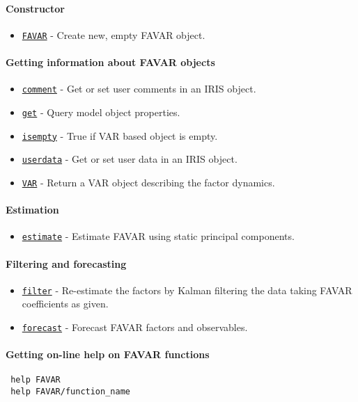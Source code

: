 

	\paragraph{Constructor}
 
 \begin{itemize}
 \item
   \href{FAVAR/FAVAR}{\texttt{FAVAR}} - Create new, empty FAVAR object.
 \end{itemize}
 
 \paragraph{Getting information about FAVAR objects}
 
 \begin{itemize}
 \item
   \href{FAVAR/comment}{\texttt{comment}} - Get or set user comments in
   an IRIS object.
 \item
   \href{FAVAR/get}{\texttt{get}} - Query model object properties.
 \item
   \href{FAVAR/isempty}{\texttt{isempty}} - True if VAR based object is
   empty.
 \item
   \href{FAVAR/userdata}{\texttt{userdata}} - Get or set user data in an
   IRIS object.
 \item
   \href{FAVAR/VAR}{\texttt{VAR}} - Return a VAR object describing the
   factor dynamics.
 \end{itemize}
 
 \paragraph{Estimation}
 
 \begin{itemize}
 \item
   \href{FAVAR/estimate}{\texttt{estimate}} - Estimate FAVAR using static
   principal components.
 \end{itemize}
 
 \paragraph{Filtering and forecasting}
 
 \begin{itemize}
 \item
   \href{FAVAR/filter}{\texttt{filter}} - Re-estimate the factors by
   Kalman filtering the data taking FAVAR coefficients as given.
 \item
   \href{FAVAR/forecast}{\texttt{forecast}} - Forecast FAVAR factors and
   observables.
 \end{itemize}
 
 \paragraph{Getting on-line help on FAVAR functions}
 
 \begin{verbatim}
 help FAVAR
 help FAVAR/function_name
 \end{verbatim}



